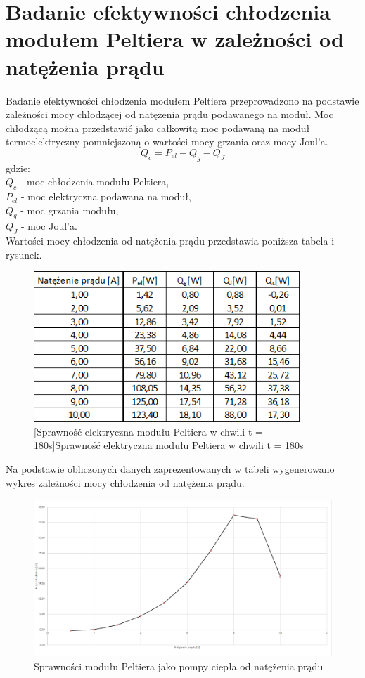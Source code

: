 \documentclass[oneside]{mgr}
\begin{document}
\section{Badanie efektywności chłodzenia modułem Peltiera w zależności od natężenia prądu}
Badanie efektywności chłodzenia modułem Peltiera przeprowadzono na podstawie zależności mocy chłodzącej od natężenia prądu podawanego na moduł. Moc chłodzącą można przedstawić jako całkowitą moc podawaną na moduł termoelektryczny pomniejszoną o wartości mocy grzania oraz mocy Joul'a.
\begin{equation}
    Q_c = P_{el}-Q_g-Q_J
\end{equation}
gdzie:\\
$Q_c$ - moc chłodzenia modułu Peltiera,\\
$P_{el}$ - moc elektryczna podawana na moduł,\\
$Q_g$ - moc grzania modułu, \\
$Q_J$ - moc Joul'a. \\

Wartości mocy chłodzenia od natężenia prądu przedstawia poniższa tabela i rysunek.
\begin{center}
\begin{figure}[h!]
    \centering
    \includegraphics[width=10cm]{Qc_dane.png}
    [Sprawność elektryczna modułu Peltiera w chwili t = 180s]{Sprawność elektryczna modułu Peltiera w chwili t = 180s}
    \end{figure}
\end{center}
Na podstawie obliczonych danych zaprezentowanych w tabeli wygenerowano wykres zależności mocy chłodzenia od natężenia prądu.
\begin{center}
\begin{figure}[h!]
    \centering
    \includegraphics[width=\textwidth]{Qc_wykres.png}
    \caption{Sprawności modułu Peltiera jako pompy ciepła od natężenia prądu}
    \end{figure}
\end{center}
\end{document}
